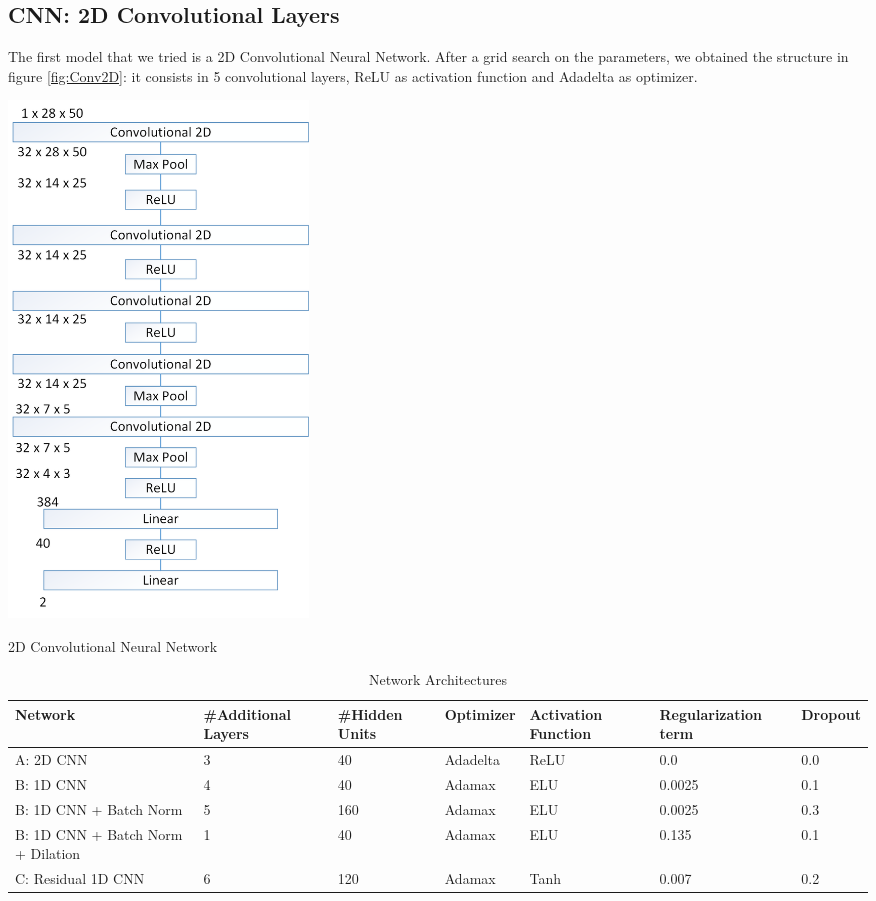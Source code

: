 \documentclass[10pt,conference,compsocconf]{IEEEtran}
\begin{document}
\subsection{CNN: 2D Convolutional Layers}
The first model that we tried is a 2D Convolutional Neural Network. After a grid search on the parameters, we obtained the structure in figure \ref{fig:Conv2D}: it consists in 5 convolutional layers, ReLU as activation function and Adadelta as optimizer.

\begin{center}
	\captionsetup{type=figure}
	\includegraphics[width=0.35\textwidth]{img/Conv2D.png}
	\caption {2D Convolutional Neural Network}
	\label{fig:Conv2D}
\end{center}

\begin{table}
	\caption{Network Architectures}
	\label{tab:netarch}
	\begin{tabular}{ | p{3cm} | p{2cm} | p{2cm} | p{2cm} | p{2cm} | p{2cm} | p{2cm} | }
		\hline
		Network & \#Additional Layers & \#Hidden Units & Optimizer & Activation Function & Regularization term & Dropout\\
		\hline
		A: 2D CNN
		& 3 & 40 & Adadelta & ReLU & 0.0 & 0.0 \\
		\hline
		B: 1D CNN
		& 4 & 40 & Adamax & ELU & 0.0025 & 0.1 \\
		\hline
		B: 1D CNN + Batch Norm
		& 5 & 160 & Adamax & ELU & 0.0025 & 0.3 \\
		\hline
		B: 1D CNN + Batch Norm + Dilation
		& 1 & 40 & Adamax & ELU & 0.135 & 0.1 \\
		\hline
		C:	Residual 1D CNN
		& 6 & 120 & Adamax & Tanh & 0.007 & 0.2 \\
		\hline
	\end{tabular}
\end{table}
\end{document}
